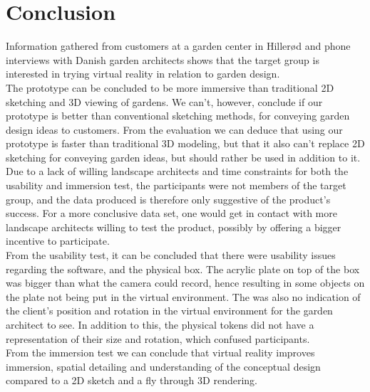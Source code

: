 \chapter{Conclusion}
Information gathered from customers at a garden center in Hillerød and phone interviews with Danish garden architects shows that the target group is interested in trying virtual reality in relation to garden design.\\

The prototype can be concluded to be more immersive than traditional 2D sketching and 3D viewing of gardens. We can't, however, conclude if our prototype is better than conventional sketching methods, for conveying garden design ideas to customers. From the evaluation we can deduce that using our prototype is faster than traditional 3D modeling, but that it also can't replace 2D sketching for conveying garden ideas, but should rather be used in addition to it.\\

Due to a lack of willing landscape architects and time constraints for both the usability and immersion test, the participants were not members of the target group, and the data produced is therefore only suggestive of the product's success. For a more conclusive data set, one would get in contact with more landscape architects willing to test the product, possibly by offering a bigger incentive to participate.\\

From the usability test, it can be concluded that there were usability issues regarding the software, and the physical box. The acrylic plate on top of the box was bigger than what the camera could record, hence resulting in some objects on the plate not being put in the virtual environment. The was also no indication of the client's position and rotation in the virtual environment for the garden architect to see. In addition to this, the physical tokens did not have a representation of their size and rotation, which confused participants.\\

From the immersion test we can conclude that virtual reality improves immersion, spatial detailing and understanding of the conceptual design compared to a 2D sketch and a fly through 3D rendering.\\


